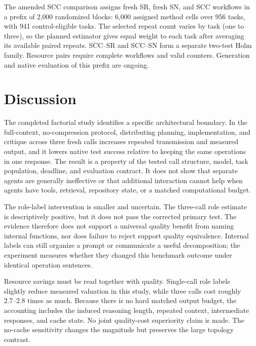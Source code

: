 The amended SCC comparison assigns fresh SR, fresh SN, and SCC workflows in a prefix of 2,000 randomized blocks: 6,000 assigned method cells over 956 tasks, with 941 control-eligible tasks. The selected repeat count varies by task (one to three), so the planned estimator gives equal weight to each task after averaging its available paired repeats. SCC--SR and SCC--SN form a separate two-test Holm family. Resource pairs require complete workflows and valid counters. Generation and native evaluation of this prefix are ongoing.


\section{Discussion}
The completed factorial study identifies a specific architectural boundary. In the full-context, no-compression protocol, distributing planning, implementation, and critique across three fresh calls increases repeated transmission and measured output, and it lowers native test success relative to keeping the same operations in one response. The result is a property of the tested call structure, model, task population, deadline, and evaluation contract. It does not show that separate agents are generally ineffective or that additional interaction cannot help when agents have tools, retrieval, repository state, or a matched computational budget.

The role-label intervention is smaller and uncertain. The three-call role estimate is descriptively positive, but it does not pass the corrected primary test. The evidence therefore does not support a universal quality benefit from naming internal functions, nor does failure to reject support quality equivalence. Internal labels can still organize a prompt or communicate a useful decomposition; the experiment measures whether they changed this benchmark outcome under identical operation sentences.

Resource savings must be read together with quality. Single-call role labels slightly reduce measured valuation in this study, while three calls cost roughly 2.7--2.8 times as much. Because there is no hard matched output budget, the accounting includes the induced reasoning length, repeated context, intermediate responses, and cache state. No joint quality-cost superiority claim is made. The no-cache sensitivity changes the magnitude but preserves the large topology contrast.

